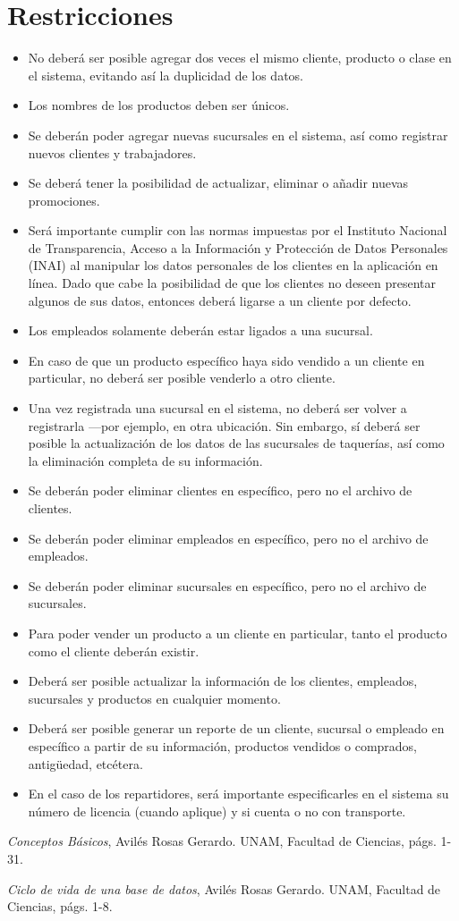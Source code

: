 \documentclass[11pt,letterpaper]{article}
\begin{document}
\section{Restricciones}
\begin{itemize}

\item No deberá ser posible agregar dos veces el mismo cliente, producto
o clase en el sistema, evitando así la duplicidad de los datos.
\item Los nombres de los productos deben ser únicos.
\item Se deberán poder agregar nuevas sucursales en el sistema, así como registrar nuevos clientes y trabajadores.
\item Se deberá tener la posibilidad de actualizar, eliminar o añadir nuevas promociones.
\item Será importante cumplir con las normas impuestas por el Instituto Nacional de Transparencia, Acceso a la Información y Protección de Datos Personales (INAI) al manipular los datos personales de los clientes en la aplicación en línea. Dado que cabe la posibilidad de que los clientes no deseen presentar algunos de sus datos, entonces deberá ligarse a un cliente por defecto.
\item Los empleados solamente deberán estar ligados a una sucursal.
\item En caso de que un producto específico haya sido vendido a un cliente en particular, no deberá ser posible venderlo a otro cliente.
\item Una vez registrada una sucursal en el sistema, no deberá ser volver a registrarla ---por ejemplo, en otra ubicación. Sin embargo, sí deberá ser posible la actualización de los datos de las sucursales de taquerías, así como la eliminación completa de su información.
\item Se deberán poder eliminar clientes en específico, pero no el archivo
de clientes.
\item Se deberán poder eliminar empleados en específico, pero no el archivo
de empleados.
\item Se deberán poder eliminar sucursales en específico, pero no el archivo
de sucursales.
\item Para poder vender un producto a un cliente en particular, tanto el producto como el cliente deberán existir.
\item Deberá ser posible actualizar la información de los clientes, empleados, sucursales
y productos en cualquier momento.
\item Deberá ser posible generar un reporte de un cliente, sucursal o empleado en específico
a partir de su información, productos vendidos o comprados, antigüedad, etcétera.
\item En el caso de los repartidores, será importante especificarles en el sistema su número de licencia (cuando aplique) y si cuenta o no con transporte.

\end{itemize}
 \begin{thebibliography}{1}


   \textit{Conceptos Básicos}, Avilés Rosas Gerardo. UNAM, Facultad de Ciencias,
págs. 1-31.

   \textit{Ciclo de vida de una base de datos}, Avilés Rosas Gerardo. UNAM, Facultad de Ciencias,
págs. 1-8.

  \end{thebibliography}
\end{document}
